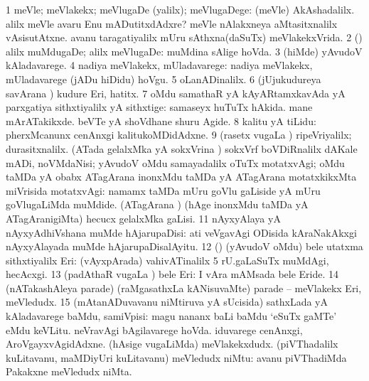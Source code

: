 \bentry
{} 
\gl{\kirxvi}
\expl{}
\bmng
\bnum
\num{1} meVle; meVlakekx; meVlugaDe (yalilx); meVlugaDege:  (meVle) AkAshadalilx.  alilx meVle avaru Enu mADutitxdAdxre?  meVle nAlakxneya aMtasitxnalilx vAsisutAtxne.  avanu taragatiyalilx mUru sAthxna(daSuTx) meVlakekxVrida. 
\num{2} (\AmA) alilx muMdugaDe; alilx meVlugaDe:  muMdina sAlige hoVda. 
\num{3} (hiMde) yAvudoV kAladavarege. 
\num{4} nadiya meVlakekx, mUladavarege:  nadiya meVlakekx, mUladavarege (jADu hiDidu) hoVgu. 
\num{5} oLanADinalilx. 
\num{6} (jUjukudureya savArana \vi) kudure Eri, hatitx. 
\num{7} oMdu samathaR yA kAyARtamxkavAda yA parxgatiya sithxtiyalilx yA sithxtige:  samaseyx huTuTx hAkida.  mane mArATakikxde.  beVTe yA shoVdhane shuru Agide. 
\num{8} kalitu yA tiLidu:  pherxMcanunx cenAnxgi kalitukoMDidAdxne. 
\num{9} (rasetx \mo vugaLa \vi) ripeVriyalilx; durasitxnalilx. 
\banum
{} (ATada gelalxMka yA sokxVrina \vi) sokxVrf boVDiRnalilx dAKale mADi, noVMdaNisi; yAvudoV oMdu samayadalilx oTuTx motatxvAgi; oMdu taMDa yA obabx ATagArana inonxMdu taMDa yA ATagArana motatxkikxMta miVrisida motatxvAgi:  namamx taMDa mUru goVlu gaLiside yA mUru goVlugaLiMda muMdide. 
 (ATagArana \vi) (hAge inonxMdu taMDa yA ATagAranigiMta) hecucx gelalxMka gaLisi. 
\eanum
\numie
\num{11} nAyxyAlaya yA nAyxyAdhiVshana muMde hAjarupaDisi:  ati veVgavAgi ODisida kAraNakAkxgi nAyxyAlayada muMde hAjarupaDisalAyitu. 
\num{12} (\birx) (yAvudoV oMdu) bele utatxma sithxtiyalilx Eri:  (vAyxpArada) vahivATinalilx 5 rU.gaLaSuTx muMdAgi, hecAcxgi. 
\num{13} (padAthaR \mo vugaLa \vi) bele Eri:  I vAra mAMsada bele Eride. 
\num{14} (nATakashAleya parade) (raMgasathxLa kANisuvaMte) parade -- meVlakekx Eri, meVledudx. 
\num{15} (mAtanADuvavanu niMtiruva yA sUcisida) sathxLada yA kAladavarege baMdu, samiVpisi:  magu nananx baLi baMdu `eSuTx gaMTe' eMdu keVLitu.  neVravAgi bAgilavarege hoVda.  iduvarege cenAnxgi, AroVgayxvAgidAdxne. 
\banum
{} (hAsige \mo vugaLiMda) meVlakekxdudx. 
 (piVThadalilx kuLitavanu, maMDiyUri kuLitavanu) meVledudx niMtu:  avanu piVThadiMda Pakakxne meVledudx niMta. 
